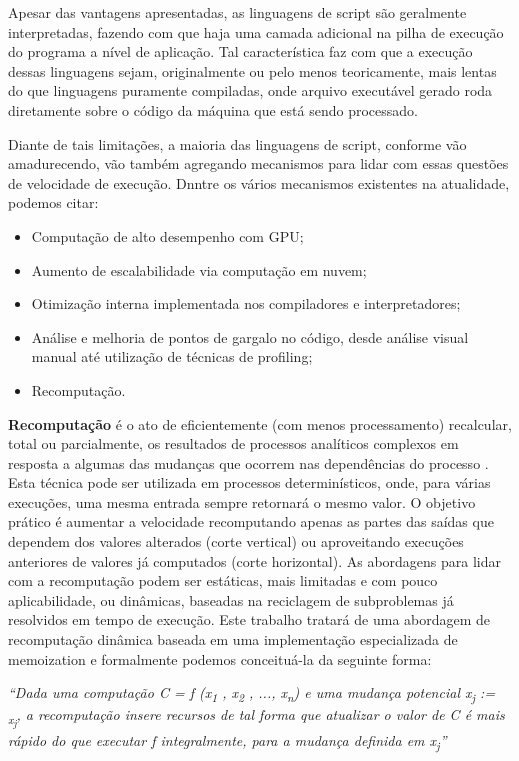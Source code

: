 \documentclass[sigconf]{acmart}
\begin{document}
Apesar das vantagens apresentadas, as linguagens de script são geralmente interpretadas, fazendo com que haja uma camada adicional na pilha de execução do programa a nível de aplicação. Tal característica faz com que a execução dessas linguagens sejam, originalmente ou pelo menos teoricamente, mais lentas do que linguagens puramente compiladas, onde arquivo executável gerado roda diretamente sobre o código da máquina que está sendo processado.

Diante de tais limitações, a maioria das linguagens de script, conforme vão amadurecendo, vão também agregando mecanismos para lidar com essas questões de velocidade de execução. Dnntre os vários mecanismos existentes na atualidade, podemos citar:
\begin{itemize}
\item Computação de alto desempenho com GPU;
\item Aumento de escalabilidade via computação em nuvem;
\item Otimização interna implementada nos compiladores e interpretadores;
\item Análise e melhoria de pontos de gargalo no código, desde análise visual manual até utilização de técnicas de profiling;
\item Recomputação.
\end{itemize}

\textbf{Recomputação} é o ato de eficientemente (com menos processamento) recalcular, total ou parcialmente, os resultados de processos analíticos complexos em resposta a algumas das mudanças que ocorrem nas dependências do processo \cite{missier2019efficient}. Esta técnica pode ser utilizada em processos determinísticos, onde, para várias execuções, uma mesma entrada sempre retornará o mesmo valor. O objetivo prático é aumentar a velocidade recomputando apenas as partes das saídas que dependem dos valores alterados \cite{carlsson2002monads} (corte vertical) ou aproveitando execuções anteriores de valores já computados (corte horizontal). As abordagens para lidar com a recomputação podem ser estáticas, mais limitadas e com pouco aplicabilidade, ou dinâmicas, baseadas na reciclagem de subproblemas já resolvidos em tempo de execução. Este trabalho tratará de uma abordagem de recomputação dinâmica baseada em uma implementação especializada de memoization e formalmente podemos conceituá-la da seguinte forma:

\textit{“Dada uma computação C = f (x\textsubscript{1} , x\textsubscript{2} , ..., x\textsubscript{n}) e uma mudança potencial x\textsubscript{j} := \textDelta \textsubscript{x\textsubscript{j}}, a recomputação insere recursos de tal forma que atualizar o valor de C é mais rápido do que executar f integralmente, para a mudança definida em x\textsubscript{j}”}
\end{document}
